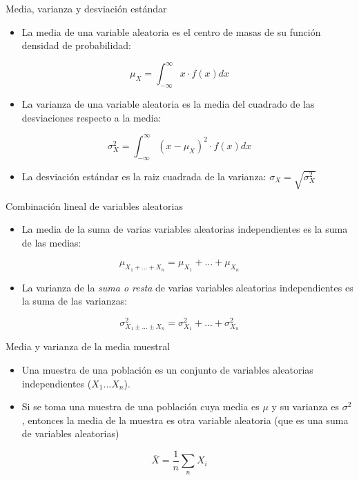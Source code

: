 \documentclass[xcolor={usenames,svgnames,dvipsnames}]{beamer}
\begin{document}
\begin{frame}[label=sec-1-5]{Media, varianza y desviación estándar}
\begin{itemize}
\item La \alert{media} de una variable aleatoria es el \alert{centro de masas} de su función densidad de probabilidad:
\end{itemize}

\[
\mu_{X}=\int_{-\infty}^{\infty}x\cdot f(x)dx
\]

\begin{itemize}
\item La \alert{varianza} de una variable aleatoria es la \alert{media del cuadrado de las desviaciones} respecto a la media:
\end{itemize}

\[
\sigma_{X}^{2}=\int_{-\infty}^{\infty}(x-\mu_{X})^{2}\cdot f(x)dx
\]

\begin{itemize}
\item La \alert{desviación estándar} es la raiz cuadrada de la varianza: $\sigma_{X}=\sqrt{\sigma_{X}^2}$
\end{itemize}
\end{frame}


\begin{frame}[label=sec-1-6]{Combinación lineal de variables aleatorias}
\begin{itemize}
\item La \alert{media de la suma} de varias variables aleatorias \alert{independientes} es
la suma de las medias:
\end{itemize}
\[
\mu_{X_{1}+...+X_{n}}=\mu_{X_{1}}+...+\mu_{X_{n}}
\]

\begin{itemize}
\item La \alert{varianza de la \emph{suma o resta}} de varias variables aleatorias
  \alert{independientes} es la \alert{suma} de las varianzas:
\end{itemize}

\[
\sigma_{X_{1}\pm...\pm X_{n}}^{2}=\sigma_{X_{1}}^{2}+...+\sigma_{X_{n}}^{2}
\]
\end{frame}


\begin{frame}[label=sec-1-7]{Media y varianza de la media muestral}
\begin{itemize}
\item Una \alert{muestra de una población} es un conjunto de variables
aleatorias independientes ($X_{1}...X_{n}$).

\item Si se toma una muestra de una población cuya media es $\mu$ y su
varianza es $\sigma^{2}$, entonces la media de la muestra es otra
variable aleatoria (que es una suma de variables aleatorias)
\end{itemize}

\[
\overline{X}=\frac{1}{n}\sum_{n}X_{i}
\]
\end{frame}
\end{document}
